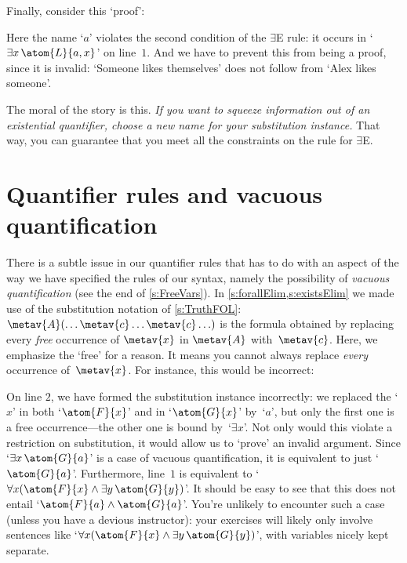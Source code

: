 Finally, consider this `proof':
\begin{fitchproof}
	\PR
	\open
		\AS
	\close
\ifHTMLtarget
\else
\fi
\end{fitchproof}
Here the name `$a$' violates the second condition of the $\exists$E
rule: it occurs in `$\exists x\, \atom{L}{a, x}$' on line~$1$. And we
have to prevent this from being a proof, since it is invalid: `Someone
likes themselves' does not follow from `Alex likes someone'.

The moral of the story is this. \emph{If you want to squeeze information out of an existential quantifier, choose a new name for your substitution instance.} That way, you can guarantee that you meet all the constraints on the rule for $\exists$E.

\section{Quantifier rules and vacuous quantification}

There is a subtle issue in our quantifier rules that has to do with an
aspect of the way we have specified the rules of our syntax, namely
the possibility of \emph{vacuous quantification} (see the end of
\cref{s:FreeVars}). In \cref{s:forallElim,s:existsElim} we made use of
the substitution notation of \cref{s:TruthFOL}: $\metav{A}(\ldots
\metav{c} \ldots \metav{c} \ldots)$ is the formula obtained by
replacing every \emph{free} occurrence of $\metav{x}$ in $\metav{A}$
with~$\metav{c}$. Here, we emphasize the `free' for a reason. It means
you cannot always replace \emph{every} occurrence of~$\metav{x}$. For
instance, this would be incorrect:
\begin{fitchproof}
	\PR
	\ifHTMLtarget
\else
\fi
\end{fitchproof}
On line $2$, we have formed the substitution instance incorrectly: we
replaced the `$x$' in both `$\atom{F}{x}$' and in `$\atom{G}{x}$'
by~`$a$', but only the first one is a free occurrence---the other one
is bound by~`$\exists x$'. Not only would this violate a restriction
on substitution, it would allow us to `prove' an invalid argument.
Since `$\exists x\,\atom{G}{a}$' is a case of vacuous quantification,
it is equivalent to just `$\atom{G}{a}$'. Furthermore, line~$1$ is
equivalent to `$\forall x(\atom{F}{x} \land \exists y\,\atom{G}{y})$'.
It should be easy to see that this does not entail `$\atom{F}{a} \land
\atom{G}{a}$'. You're unlikely to encounter such a case (unless you
have a devious instructor): your exercises will likely only involve
sentences like `$\forall x(\atom{F}{x} \land \exists
y\,\atom{G}{y})$', with variables nicely kept separate.


